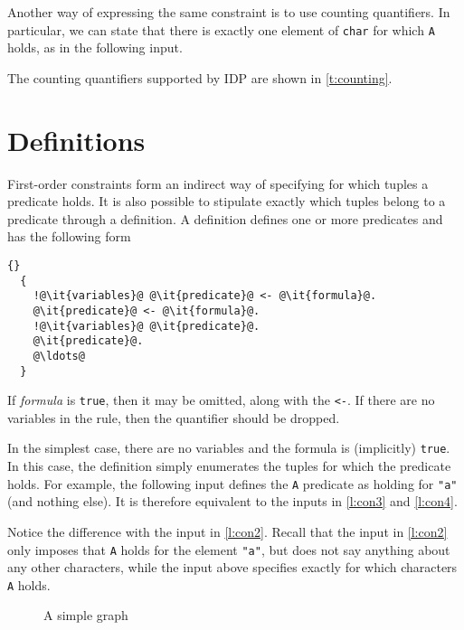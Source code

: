 \documentclass{article}
\newcommand{\idp}{{\sc IDP}\xspace}
\begin{document}
Another way of expressing the same constraint is to use counting quantifiers.
In particular, we can state that there is exactly one element of
\texttt{char} for which \texttt{A} holds, as in the following input.

The counting quantifiers supported by \idp are shown in
\autoref{t:counting}.

\section{Definitions}\label{s:definitions}

First-order constraints form an indirect way of specifying
for which tuples a predicate holds.
It is also possible to stipulate exactly which tuples
belong to a predicate through a definition.
A definition defines one or more predicates and has the following
form
\begin{lstlisting}[escapechar=@]{}
  {
    !@\it{variables}@ @\it{predicate}@ <- @\it{formula}@.
    @\it{predicate}@ <- @\it{formula}@.
    !@\it{variables}@ @\it{predicate}@.
    @\it{predicate}@.
    @\ldots@
  }
\end{lstlisting}
If \textit{formula} is \texttt{true}, then it may be omitted, along with
the \texttt{<-}.  If there are no variables in the rule, then the
quantifier should be dropped.

In the simplest case, there are no variables and the formula is
(implicitly) \texttt{true}.  In this case, the definition simply
enumerates the tuples for which the predicate holds.
For example, the following input defines the \texttt{A} predicate
as holding for \texttt{"a"} (and nothing else).
It is therefore equivalent to the inputs in \autoref{l:con3}
and \autoref{l:con4}.

Notice the difference with the input in \autoref{l:con2}.
Recall that the input in \autoref{l:con2} only imposes that \texttt{A} holds
for the element \lstinline!"a"!, but does not say anything about any
other characters, while the input above specifies exactly for which
characters \texttt{A} holds.

\begin{figure}
\centering%
\caption{A simple graph}
\label{f:graph}
\end{figure}
\end{document}
